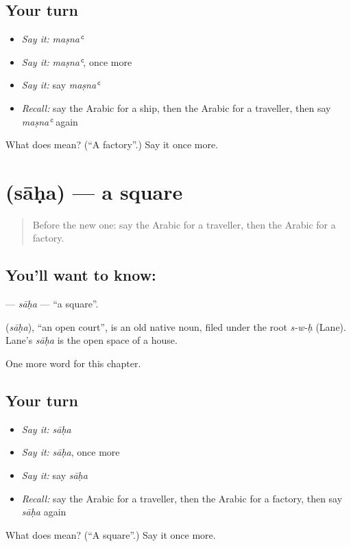 \subsection*{Your turn}
\begin{itemize}
\raggedright
  \item \emph{Say it:} \emph{maṣnaʿ}
  \item \emph{Say it:} \emph{maṣnaʿ}, once more
  \item \emph{Say it:} say \emph{maṣnaʿ}
  \item \emph{Recall:} say the Arabic for a ship, then the Arabic for a traveller, then say \emph{maṣnaʿ} again
\end{itemize}

\begin{tcolorbox}[breakable,colback=teal!4,colframe=teal!35!black,title={Before you move on}]
What does  mean? (\textquotedblleft{}A factory\textquotedblright{}.) Say it once more.
\end{tcolorbox}
\section[\texorpdfstring{\ar{ساحة} (sāḥa)}{ساحة (sāḥa)}]{ (sāḥa) — a square}

\label{lesson:AR-C142-saha}



\begin{quote}
Before the new one: say the Arabic for a traveller, then the Arabic for a factory.
\end{quote}

\subsection*{You'll want to know: }
\textbf{} — \emph{sāḥa} — \textquotedblleft{}a square\textquotedblright{}.

\begin{cousinweb}
\textbf{} (\emph{sāḥa}), \textquotedblleft{}an open court\textquotedblright{}, is an old native noun, filed under the root \emph{s-w-ḥ} (Lane). Lane's \emph{sāḥa} is the open space of a house.
\end{cousinweb}

\begin{grammarlens}[title={What you've built}]
One more word for this chapter.
\end{grammarlens}

\subsection*{Your turn}
\begin{itemize}
\raggedright
  \item \emph{Say it:} \emph{sāḥa}
  \item \emph{Say it:} \emph{sāḥa}, once more
  \item \emph{Say it:} say \emph{sāḥa}
  \item \emph{Recall:} say the Arabic for a traveller, then the Arabic for a factory, then say \emph{sāḥa} again
\end{itemize}

\begin{tcolorbox}[breakable,colback=teal!4,colframe=teal!35!black,title={Before you move on}]
What does  mean? (\textquotedblleft{}A square\textquotedblright{}.) Say it once more.
\end{tcolorbox}
